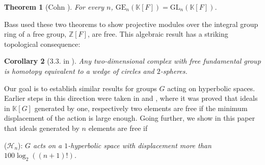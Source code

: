 \documentclass[11pt,letterpaper]{amsart}
\newtheorem{theorem}{Theorem}
\newtheorem{corollary}[theorem]{Corollary}
\newtheorem*{remark}{Remark}
\begin{document}
\begin{theorem}[Cohn \cite{cohngl}]
For every $n$, $\mathrm{GE}_n(\mathbb K[F])=\mathrm{GL}_n(\mathbb K[F])$. 
\end{theorem}
Bass \cite{bass} used these two theorems to show projective modules over the integral group ring of a free group, $\mathbb Z[F]$, are free. This algebraic result has a striking topological consequence: \begin{corollary}[3.3. in \cite{wall}]
\label{standard}
Any two-dimensional complex with free fundamental group is homotopy equivalent to a wedge of circles and $2$-spheres.
\end{corollary}

Our goal is to establish similar results for groups $G$ acting on hyperbolic spaces. Earlier steps in this direction were taken in \cite{delzant} and \cite{avramidi}, where it was proved that ideals in $\mathbb K[G]$ generated by one, respectively two elements are free if the minimum displacement of the action is large enough. Going further, we show in this paper that ideals generated by $n$ elements are free if 
\vspace{0.3cm}

\noindent ($\mathcal{H}_{n}$):\hspace{0.1cm} {\it $G$ acts on a $1$-hyperbolic space with displacement more than %
$100\log_2((n+1)!)$.}
\end{document}

